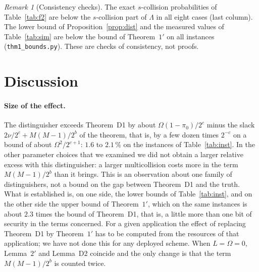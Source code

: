\documentclass[11pt,a4paper]{article}
\theoremstyle{definition}
\theoremstyle{remark}
\newtheorem{remark}{Remark}
\newcommand{\file}[1]{\texttt{#1}}
\begin{document}
\begin{remark}[Consistency checks]
The exact $s$-collision probabilities of Table~\ref{tab:f2} are below the $s$-collision part of $\Lambda$ in all eight
cases (last column). The lower bound of Proposition~\ref{prop:dist} and the measured values of Table~\ref{tab:sim} are below the
bound of Theorem~$1'$ on all instances (\file{thm1\_bounds.py}). These are checks of consistency, not proofs.
\end{remark}

\section{Discussion}\label{sec:discussion}

\paragraph{Size of the effect.}
The distinguisher exceeds Theorem~D1 by about $\Omega(1 - \pi_0)/2^c$ minus the slack
$2\nu/2^c + M(M-1)/2^b$ of the theorem, that is, by a few dozen times $2^{-c}$ on a bound of about $\Omega^2/2^{c+1}$:
$1.6$ to $2.1\,\%$ on the instances of Table~\ref{tab:inst}. In the other parameter choices that we examined we did not
obtain a larger relative excess with this distinguisher: a larger multicollision costs more in the term $M(M-1)/2^b$ than it
brings. This is an observation about one family of distinguishers, not a bound on the gap between Theorem~D1 and
the truth. What is established is, on one side, the lower bounds of Table~\ref{tab:inst}, and on the other side the upper bound of
Theorem~$1'$, which on the same instances is about $2.3$ times the bound of Theorem~D1, that is, a little more than one bit
of security in the terms concerned. For a given application the effect of replacing Theorem~D1 by Theorem~$1'$ has to be
computed from the resources of that application; we have not done this for any deployed scheme. When $L = \Omega = 0$,
Lemma~$2'$ and Lemma~D2 coincide and the only change is that the term $M(M-1)/2^b$ is counted twice.
\end{document}
